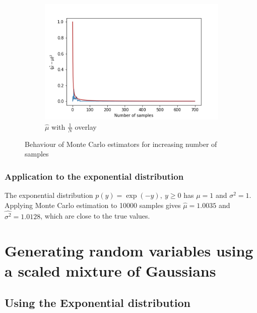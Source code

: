 \documentclass[a4paper]{article}
\begin{document}
\begin{figure}[h]
\begin{subfigure}[b]{0.3\textwidth}
        \includegraphics[width=\textwidth]{figures/monte_carlo_mean_best_fit.png}
        \caption{$\hat{\mu}$ with $\frac{1}{N}$ overlay}
        \label{fig:monte_carlo_mean_best_fit}
    \end{subfigure}
    \caption{Behaviour of Monte Carlo estimators for increasing number of samples}
    \label{fig:monte_carlo_convergence}
\end{figure}

\subsubsection{Application to the exponential distribution}
The exponential distribution $p(y) = \exp(-y), \ y \geq 0$ has $\mu = 1$ and $\sigma^2 = 1$.
Applying Monte Carlo estimation to 10000 samples gives $\hat{\mu} = 1.0035$ and $\hat{\sigma^2} = 1.0128$, which are
close to the true values.



\section{Generating random variables using a scaled mixture of Gaussians}

\subsection{Using the Exponential distribution}
\end{document}
